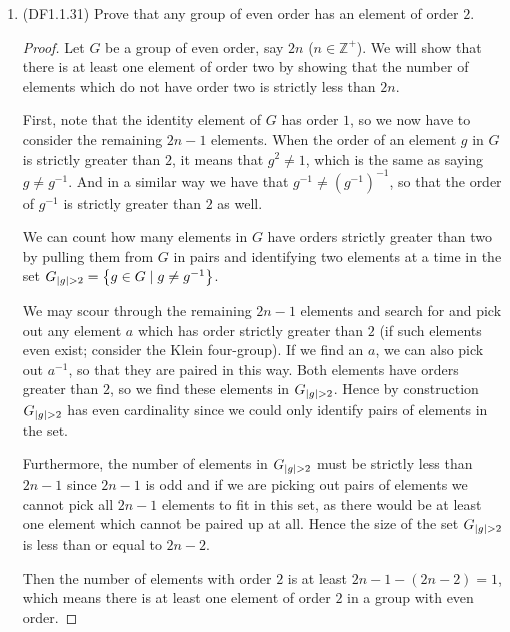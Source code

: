 \documentclass[11pt]{article}
\newcommand{\cbr}[1]{\left\{#1\right\}}
\begin{document}
\begin{enumerate}
    \item (DF1.1.31) Prove that any group of even order has an element of order $2$. \begin{proof}
      Let $G$ be a group of even order, say $2n$ ($n\in\mathbb{Z}^+$). We will show that there is at least one element of order two by showing that the number of elements which do not have order two is strictly less than $2n$.

      First, note that the identity element of $G$ has order $1$, so we now have to consider the remaining $2n-1$ elements. When the order of an element $g$ in $G$ is strictly greater than $2$, it means that $g^2\neq 1$, which is the same as saying $g \neq g^{-1}$. And in a similar way we have that $g^{-1} \neq (g^{-1})^{-1}$, so that the order of $g^{-1}$ is strictly greater than $2$ as well.

      We can count how many elements in $G$ have orders strictly greater than two by pulling them from $G$ in pairs and identifying two elements at a time in the set $G_{\abs{g}>2} = \cbr{g\in G\mid g\neq g^{-1}}$.

      We may scour through the remaining $2n-1$ elements and search for and pick out any element $a$ which has order strictly greater than $2$ (if such elements even exist; consider the Klein four-group). If we find an $a$, we can also pick out $a^{-1}$, so that they are paired in this way. Both elements have orders greater than $2$, so we find these elements in $G_{\abs{g}>2}$. Hence by construction $G_{\abs{g}>2}$ has even cardinality since we could only identify pairs of elements in the set.
        
      Furthermore, the number of elements in $G_{\abs{g}>2}$ must be strictly less than $2n-1$ since $2n-1$ is odd and if we are picking out pairs of elements we cannot pick all $2n-1$ elements to fit in this set, as there would be at least one element which cannot be paired up at all. Hence the size of the set $G_{\abs{g}>2}$ is less than or equal to $2n-2$. 

      Then the number of elements with order $2$ is at least $2n - 1 - (2n-2) = 1$, which means there is at least one element of order $2$ in a group with even order.\end{proof}


\end{enumerate}
\end{document}
